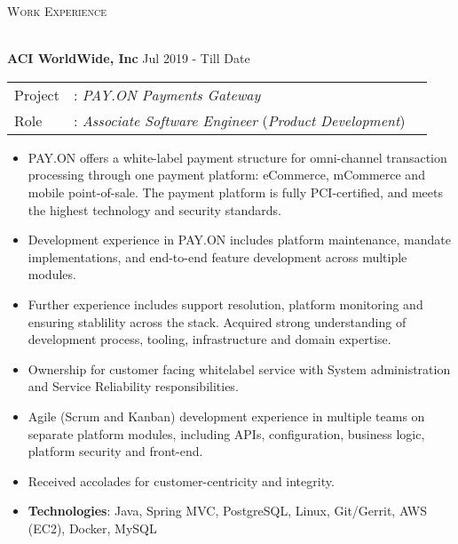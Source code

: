 \documentclass[a4paper]{article}
\newcommand{\lineunder} {
    \vspace*{-8pt} \\
    \hspace*{-18pt} \hrulefill \\
}
\newcommand{\header} [1] {
    {\hspace*{-18pt}\vspace*{6pt} \textsc{#1}}
    \vspace*{-6pt} \lineunder
}
\begin{document}
\header{Work Experience}
\vspace{1mm}

\textbf{ACI WorldWide, Inc} \hfill Jul 2019 - Till Date\\
\begin{tabular}{ l l l }
Project & : \textit{PAY.ON Payments Gateway} \\
Role & : \textit{Associate Software Engineer} (\textit{Product Development}) \\
\end{tabular}
\vspace{-1mm}
\begin{itemize} \itemsep 1pt
	\item PAY.ON offers a white-label payment structure for omni-channel transaction processing through one payment platform: eCommerce, mCommerce and mobile point-of-sale. The payment platform is fully PCI-certified, and meets the highest technology and security standards.
	\item Development experience in PAY.ON includes platform maintenance, mandate implementations, and end-to-end feature development across multiple modules.
  \item Further experience includes support resolution, platform monitoring and ensuring stablility across the stack. Acquired strong understanding of development process, tooling, infrastructure and domain expertise.
  \item Ownership for customer facing whitelabel service with System administration and Service Reliability responsibilities.
  \item Agile (Scrum and Kanban) development experience in multiple teams on separate platform modules, including APIs, configuration, business logic, platform security and front-end.
  \item Received accolades for customer-centricity and integrity.
	\item \textbf{Technologies}: Java, Spring MVC, PostgreSQL, Linux, Git/Gerrit, AWS (EC2), Docker, MySQL
\end{itemize}
\end{document}
